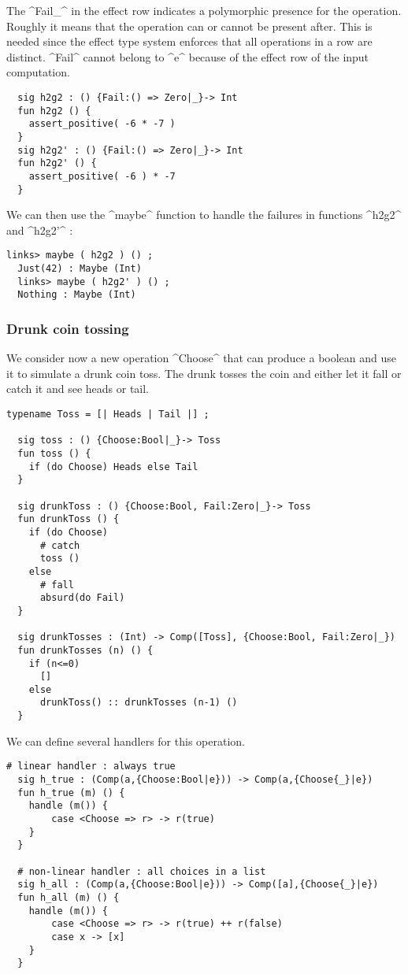 \documentclass[nonacm=true, language=french, language=english]{acmart}
\begin{document}
The ^Fail{_}^ in the effect row indicates a polymorphic presence for the operation. Roughly it means that the operation can or cannot be present after. This is needed since the effect type system enforces that all operations in a row are distinct. ^Fail^ cannot belong to ^e^ because of the effect row of the input computation.

\begin{lstlisting}
  sig h2g2 : () {Fail:() => Zero|_}-> Int
  fun h2g2 () {
    assert_positive( -6 * -7 )
  }
  sig h2g2' : () {Fail:() => Zero|_}-> Int
  fun h2g2' () {
    assert_positive( -6 ) * -7
  }
\end{lstlisting}

We can then use the ^maybe^ function to handle the failures in functions ^h2g2^ and ^h2g2'^ :

\begin{lstlisting}[caption=Links console]
  links> maybe ( h2g2 ) () ;
  Just(42) : Maybe (Int)
  links> maybe ( h2g2' ) () ;
  Nothing : Maybe (Int)
\end{lstlisting}


\subsubsection{Drunk coin tossing}

We consider now a new operation ^Choose^ that can produce a boolean and use it to simulate a drunk coin toss. The drunk tosses the coin and either let it fall or catch it and see heads or tail.

\begin{lstlisting}[caption=Drunk toss]
  typename Toss = [| Heads | Tail |] ;

  sig toss : () {Choose:Bool|_}-> Toss
  fun toss () {
    if (do Choose) Heads else Tail
  }

  sig drunkToss : () {Choose:Bool, Fail:Zero|_}-> Toss
  fun drunkToss () {
    if (do Choose)
      # catch
      toss ()
    else
      # fall
      absurd(do Fail)
  }

  sig drunkTosses : (Int) -> Comp([Toss], {Choose:Bool, Fail:Zero|_})
  fun drunkTosses (n) () {
    if (n<=0)
      []
    else
      drunkToss() :: drunkTosses (n-1) ()
  }
\end{lstlisting}

We can define several handlers for this operation.

\begin{lstlisting}[caption=Toss handlers]
  # linear handler : always true
  sig h_true : (Comp(a,{Choose:Bool|e})) -> Comp(a,{Choose{_}|e})
  fun h_true (m) () {
    handle (m()) {
        case <Choose => r> -> r(true)
    }
  }

  # non-linear handler : all choices in a list
  sig h_all : (Comp(a,{Choose:Bool|e})) -> Comp([a],{Choose{_}|e})
  fun h_all (m) () {
    handle (m()) {
        case <Choose => r> -> r(true) ++ r(false)
        case x -> [x]
    }
  }
\end{lstlisting}
\end{document}
